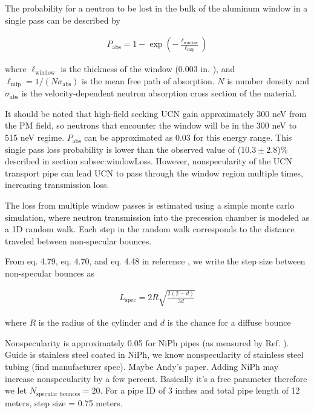 The probability for a neutron to be lost in the bulk of the aluminum window in a single pass can be described by

\begin{gather}
   P_\text{abs} = 1 - \exp \left( - \frac{\ell_\text{window} }{ \ell_\text{mfp} } \right)
\end{gather}

where $\ell_\text{window}$ is the thickness of the window (0.003 in. ), and $\ell_\text{mfp} = 1 / (N\sigma_\text{abs})$ is the mean free path of absorption. $N$ is number density and $\sigma_\text{abs}$ is the velocity-dependent neutron absorption cross section of the material. 

It should be noted that high-field seeking UCN gain approximately 300 neV from the PM field, so neutrons that encounter the window will be in the 300 neV to 515 neV regime. $P_\text{abs}$ can be approximated as 0.03 for this energy range. This single pass loss probability is lower than the observed value of ($10.3\pm 2.8$)\% described in section subsec:windowLoss. However, nonspecularity of the UCN transport pipe can lead UCN to pass through the window region multiple times, increasing transmission loss. 

The loss from multiple window passes is estimated using a simple monte carlo simulation, where neutron transmission into the precession chamber is modeled as a 1D random walk. Each step in the random walk corresponds to the distance traveled between non-specular bounces. 

From eq. 4.79, eq. 4.70, and eq. 4.48 in reference \cite{golubUCN}, we write the step size between non-specular bounces as

\begin{gather}
    L_\text{spec} = 2 R\sqrt{\frac{2(2-d)}{3d} }
\end{gather}


where $R$ is the radius of the cylinder and $d$ is the chance for a diffuse bounce

Nonspecularity is approximately 0.05 for NiPh pipes (as measured by Ref. \cite{pattie_jr_evaluation_2017}). {\color{blue}Guide is stainless steel coated in NiPh, we know nonspecularity of stainless steel tubing (find manufacturer spec). Maybe Andy's paper. Adding NiPh may increase nonspecularity by a few percent. Basically it's a free parameter} therefore we let $N_\text{specular bounces} = 20$. For a pipe ID of 3 inches and total pipe length of 12 meters, step size = 0.75 meters.

